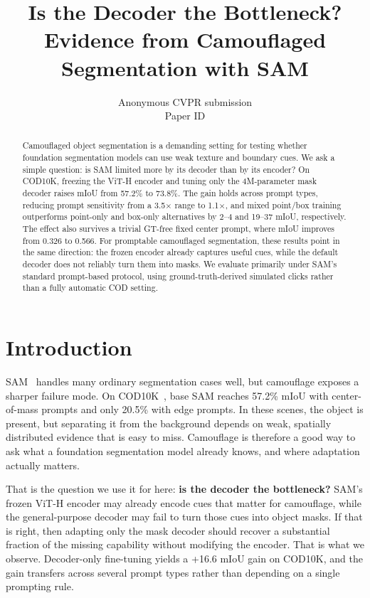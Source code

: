 \documentclass[10pt,twocolumn,letterpaper]{article}
\title{Is the Decoder the Bottleneck? Evidence from Camouflaged Segmentation with SAM}
\author{Anonymous CVPR submission\\Paper ID \paperID}
\begin{document}
\maketitle

\begin{abstract}
Camouflaged object segmentation is a demanding setting for testing whether foundation segmentation models can use weak texture and boundary cues. We ask a simple question: is SAM limited more by its decoder than by its encoder? On COD10K, freezing the ViT-H encoder and tuning only the 4M-parameter mask decoder raises mIoU from 57.2\% to 73.8\%. The gain holds across prompt types, reducing prompt sensitivity from a 3.5$\times$ range to 1.1$\times$, and mixed point/box training outperforms point-only and box-only alternatives by 2--4 and 19--37 mIoU, respectively. The effect also survives a trivial GT-free fixed center prompt, where mIoU improves from 0.326 to 0.566. For promptable camouflaged segmentation, these results point in the same direction: the frozen encoder already captures useful cues, while the default decoder does not reliably turn them into masks. We evaluate primarily under SAM's standard prompt-based protocol, using ground-truth-derived simulated clicks rather than a fully automatic COD setting.
\end{abstract}

\section{Introduction}
SAM~\cite{kirillov2023sam} handles many ordinary segmentation cases well, but camouflage exposes a sharper failure mode. On COD10K~\cite{fan2020cod10k}, base SAM reaches 57.2\% mIoU with center-of-mass prompts and only 20.5\% with edge prompts. In these scenes, the object is present, but separating it from the background depends on weak, spatially distributed evidence that is easy to miss. Camouflage is therefore a good way to ask what a foundation segmentation model already knows, and where adaptation actually matters.

That is the question we use it for here: \textbf{is the decoder the bottleneck?} SAM's frozen ViT-H encoder may already encode cues that matter for camouflage, while the general-purpose decoder may fail to turn those cues into object masks. If that is right, then adapting only the mask decoder should recover a substantial fraction of the missing capability without modifying the encoder. That is what we observe. Decoder-only fine-tuning yields a +16.6 mIoU gain on COD10K, and the gain transfers across several prompt types rather than depending on a single prompting rule.
\end{document}
